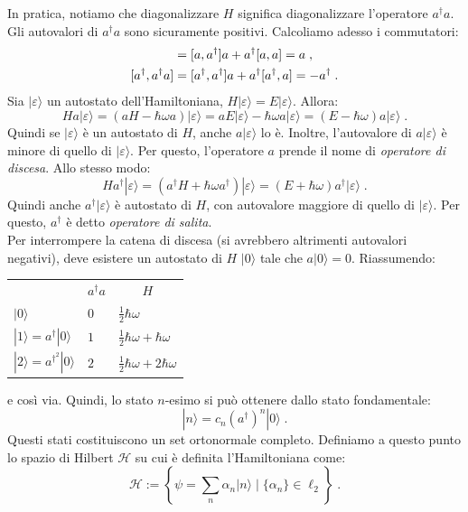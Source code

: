 \documentclass[12pt,a4paper]{report}
\theoremstyle{definition}
\newcommand{\ham}{\mathcal{H}}
\numberwithin{equation}{section}
\newcommand{\ket}{\rangle}
\newcommand{\adj}[1]{#1^{\dagger}}
\begin{document}
In pratica, notiamo che diagonalizzare $H$ significa diagonalizzare l'operatore $\adj{a}a$. Gli autovalori di $\adj{a}a$ sono sicuramente positivi. Calcoliamo adesso i commutatori:
\begin{align}
[a,\adj{a}a] &= [a,\adj{a}]a+\adj{a}[a,a]=a\;, \notag \\
[\adj{a},\adj{a}a] &= [\adj{a},\adj{a}]a+\adj{a}[\adj{a},a]=-\adj{a}\;.
\end{align}
Sia $|\varepsilon\ket$ un autostato dell'Hamiltoniana, $H|\varepsilon\ket=E|\varepsilon\ket$. Allora:
$$
Ha|\varepsilon\ket=(aH-\hbar\omega a)|\varepsilon\ket=aE|\varepsilon\ket-\hbar\omega a|\varepsilon\ket=(E-\hbar\omega)a|\varepsilon\ket\;.
$$
Quindi se $|\varepsilon\ket$ è un autostato di $H$, anche $a|\varepsilon\ket$ lo è. Inoltre, l'autovalore di $a|\varepsilon\ket$ è minore di quello di $|\varepsilon\ket$. Per questo, l'operatore $a$ prende il nome di \textit{operatore di discesa}. Allo stesso modo:
$$
H\adj{a}|\varepsilon\ket=(\adj{a}H+\hbar\omega\adj{a})|\varepsilon\ket=(E+\hbar\omega)\adj{a}|\varepsilon\ket\;.
$$
Quindi anche $\adj{a}|\varepsilon\ket$ è autostato di $H$, con autovalore maggiore di quello di $|\varepsilon\ket$. Per questo, $\adj{a}$ è detto \textit{operatore di salita}. \\
Per interrompere la catena di discesa (si avrebbero altrimenti autovalori negativi), deve esistere un autostato di $H$ $|0\ket$ tale che $a|0\ket=0$. Riassumendo:
\begin{table}[h]
\centering
\begin{tabular}{l l l}
\multicolumn{1}{c}{ } &
\multicolumn{1}{c}{$\adj{a}a$} &
\multicolumn{1}{c}{$H$} \\
$|0\ket$ & $0$ & $\frac{1}{2}\hbar\omega$ \\
$|1\ket=\adj{a}|0\ket$ & $1$ & $\frac{1}{2}\hbar\omega+\hbar\omega$ \\ 
$|2\ket=a^{\dagger^2}|0\ket$ & $2$ & $\frac{1}{2}\hbar\omega+2\hbar\omega$ \\
\end{tabular}
\end{table}
e così via. Quindi, lo stato $n$-esimo si può ottenere dallo stato fondamentale:
\begin{equation}
|n\ket=c_n(\adj{a})^n|0\ket\;.
\end{equation}
Questi stati costituiscono un set ortonormale completo. Definiamo a questo punto lo spazio di Hilbert $\ham$ su cui è definita l'Hamiltoniana come:
\begin{equation}
\ham:=\left\{\psi=\sum_n \alpha_n|n\ket\; |\;\{\alpha_n\}\in \ell_2\right\}\;.
\end{equation}
\end{document}
